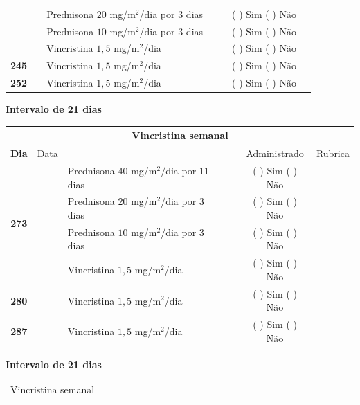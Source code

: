 \documentclass[11pt,a4paper,oldfontcommands]{memoir}
\begin{document}
\begin{center}
\begin{longtable}{p{1cm}c|p{5cm}|p{1cm}p{2cm}|c|c}
    \multicolumn{1}{c|}{}&&{Prednisona \(20\) mg/m\(^2\)/dia por 3 dias}&\multicolumn{1}{c}{}&&{(  ) Sim (  ) Não}&\\
    \multicolumn{1}{c|}{}&&{Prednisona \(10\) mg/m\(^2\)/dia por 3 dias}&\multicolumn{1}{c}{}&&{(  ) Sim (  ) Não}&\\
    \multicolumn{1}{c|}{\textbf{}}&&{Vincristina \(1,5\) mg/m\(^2\)/dia}&\multicolumn{1}{c}{}&&{(  ) Sim (  ) Não}&\\
    \cline{1-6}
    \multicolumn{1}{c|}{\textbf{245}}&&{Vincristina \(1,5\) mg/m\(^2\)/dia}&\multicolumn{1}{c}{}&&{(  ) Sim (  ) Não}&\\
    \cline{1-3}\cline{6-6}
    \multicolumn{1}{c|}{\textbf{252}}&&{Vincristina \(1,5\) mg/m\(^2\)/dia}&\multicolumn{1}{c}{}&&{(  ) Sim (  ) Não}&\\
    \hline
\end{longtable}
\textbf{Intervalo de 21 dias}
\\[1.5cm]
\begin{longtable}{p{1cm}c|p{5cm}|p{1cm}p{2cm}|c|c}
	\hline
	\multicolumn{7}{c}{Vincristina semanal} \\
	\hline
	\multicolumn{1}{c|}{\multirow{1}{*}{\textbf{Dia}}}&{Data}&{}&{}&&{Administrado}&{Rubrica} \\
    \hline
    \multicolumn{1}{c|}{\multirow{4}{*}{\textbf{273}}}&&{Prednisona \(40\) mg/m\(^2\)/dia por 11 dias}&\multicolumn{1}{c}{}&&{(  ) Sim (  ) Não}&\\
    \multicolumn{1}{c|}{}&&{Prednisona \(20\) mg/m\(^2\)/dia por 3 dias}&\multicolumn{1}{c}{}&&{(  ) Sim (  ) Não}&\\
    \multicolumn{1}{c|}{}&&{Prednisona \(10\) mg/m\(^2\)/dia por 3 dias}&\multicolumn{1}{c}{}&&{(  ) Sim (  ) Não}&\\
    \multicolumn{1}{c|}{\textbf{}}&&{Vincristina \(1,5\) mg/m\(^2\)/dia}&\multicolumn{1}{c}{}&&{(  ) Sim (  ) Não}&\\
    \cline{1-6}
    \multicolumn{1}{c|}{\textbf{280}}&&{Vincristina \(1,5\) mg/m\(^2\)/dia}&\multicolumn{1}{c}{}&&{(  ) Sim (  ) Não}&\\
    \cline{1-3}\cline{6-6}
    \multicolumn{1}{c|}{\textbf{287}}&&{Vincristina \(1,5\) mg/m\(^2\)/dia}&\multicolumn{1}{c}{}&&{(  ) Sim (  ) Não}&\\
    \hline
\end{longtable}
\textbf{Intervalo de 21 dias}
\begin{longtable}{p{1cm}c|p{5cm}|p{1cm}p{2cm}|c|c}
	\hline
	\multicolumn{7}{c}{Vincristina semanal} \\

\end{longtable}
\end{center}
\end{document}
